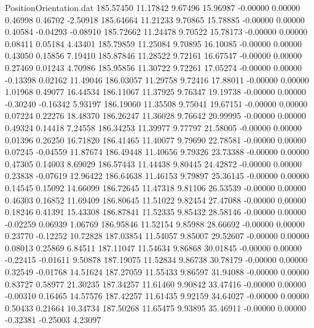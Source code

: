 \begin{filecontents}{PositionOrientation.dat}
 185.57450   11.17842    9.67496    15.96987   -0.00000    0.00000    0.46998    0.46702   -2.50918
 185.64664   11.21233    9.70865    15.78885   -0.00000    0.00000    0.40584   -0.04293   -0.08910
 185.72662   11.24478    9.70522    15.78173   -0.00000    0.00000    0.08411    0.05184    4.43401
 185.79859   11.25084    9.70895    16.10085   -0.00000    0.00000    0.43050    0.15856    7.19410
 185.87846   11.28522    9.72161    16.67547   -0.00000    0.00000    0.27469    0.01243    4.70986
 185.95856   11.30722    9.72261    17.05274   -0.00000    0.00000   -0.13398    0.02162   11.49046
 186.03057   11.29758    9.72416    17.88011   -0.00000    0.00000    1.01968    0.49077   16.44534
 186.11067   11.37925    9.76347    19.19738   -0.00000    0.00000   -0.30240   -0.16342    5.93197
 186.19060   11.35508    9.75041    19.67151   -0.00000    0.00000    0.07224    0.22276   18.48370
 186.26247   11.36028    9.76642    20.99995   -0.00000    0.00000    0.49324    0.14418    7.24558
 186.34253   11.39977    9.77797    21.58005   -0.00000    0.00000    0.01396    0.26250   16.71820
 186.41465   11.40077    9.79690    22.78581   -0.00000    0.00000    0.07245   -0.04559   11.87674
 186.49448   11.40656    9.79326    23.73388   -0.00000    0.00000    0.47305    0.14003    8.69029
 186.57443   11.44438    9.80445    24.42872   -0.00000    0.00000    0.23838   -0.07619   12.96422
 186.64638   11.46153    9.79897    25.36145   -0.00000    0.00000    0.14545    0.15092   14.66099
 186.72645   11.47318    9.81106    26.53539   -0.00000    0.00000    0.46303    0.16852   11.69409
 186.80645   11.51022    9.82454    27.47088   -0.00000    0.00000    0.18246    0.41391   15.43308
 186.87841   11.52335    9.85432    28.58146   -0.00000    0.00000   -0.02259    0.06939    1.06769
 186.95846   11.52154    9.85988    28.66692   -0.00000    0.00000    0.23770   -0.12252   10.72828
 187.03854   11.54057    9.85007    29.52607   -0.00000    0.00000    0.08013    0.25869    6.84511
 187.11047   11.54634    9.86868    30.01845   -0.00000    0.00000   -0.22415   -0.01611    9.50878
 187.19075   11.52834    9.86738    30.78179   -0.00000    0.00000    0.32549   -0.01768   14.51624
 187.27059   11.55433    9.86597    31.94088   -0.00000    0.00000    0.83727    0.58977   21.30235
 187.34257   11.61460    9.90842    33.47416   -0.00000    0.00000   -0.00310    0.16465   14.57576
 187.42257   11.61435    9.92159    34.64027   -0.00000    0.00000    0.50433    0.21664   10.34734
 187.50268   11.65475    9.93895    35.46911   -0.00000    0.00000   -0.32381   -0.25003    4.23097

\end{filecontents}

